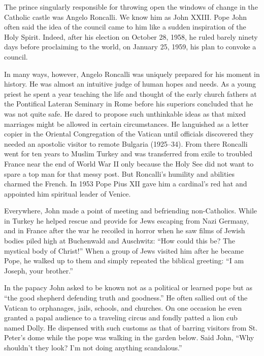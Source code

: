 The prince singularly responsible for throwing open the windows of change in the Catholic castle was
Angelo Roncalli. We know him as John XXIII. Pope John often said the idea of the council came to him
like a sudden inspiration of the Holy Spirit. Indeed, after his election on October 28, 1958, he
ruled barely ninety days before proclaiming to the world, on January 25, 1959, his plan to convoke a
council.

In many ways, however, Angelo Roncalli was uniquely prepared for his moment in history. He was
almost an intuitive judge of human hopes and needs. As a young priest he spent a year teaching the
life and thought of the early church fathers at the Pontifical Lateran Seminary in Rome before his
superiors concluded that he was not quite safe. He dared to propose such unthinkable ideas as that
mixed marriages might be allowed in certain circumstances. He languished as a letter copier in the
Oriental Congregation of the Vatican until officials discovered they needed an apostolic visitor to
remote Bulgaria (1925–34). From there Roncalli went for ten years to Muslim Turkey and was
transferred from exile to troubled France near the end of World War II only because the Holy See did
not want to spare a top man for that messy post. But Roncalli’s humility and abilities charmed the
French. In 1953 Pope Pius XII gave him a cardinal’s red hat and appointed him spiritual leader of
Venice.

Everywhere, John made a point of meeting and befriending non-Catholics. While in Turkey he helped
rescue and provide for Jews escaping from Nazi Germany, and in France after the war he recoiled in
horror when he saw films of Jewish bodies piled high at Buchenwald and Auschwitz: “How could this
be? The mystical body of Christ!” When a group of Jews visited him after he became Pope, he walked
up to them and simply repeated the biblical greeting: “I am Joseph, your brother.”

In the papacy John asked to be known not as a political or learned pope but as “the good shepherd
defending truth and goodness.” He often sallied out of the Vatican to orphanages, jails, schools,
and churches. On one occasion he even granted a papal audience to a traveling circus and fondly
patted a lion cub named Dolly. He dispensed with such customs as that of barring visitors from St.
Peter’s dome while the pope was walking in the garden below. Said John, “Why shouldn’t they look?
I’m not doing anything scandalous.”

